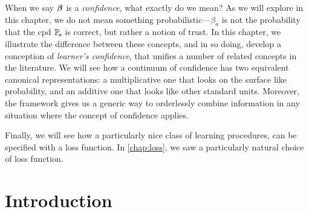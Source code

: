     \label{chap:conf}

When we say $\boldsymbol\beta$ is a \emph{confidence}, what exactly do we mean? 
As we will explore in this chapter, we do not mean something probabilistic---$\beta_a$ is not the probability that the cpd $\p_a$ is correct, but rather a notion of trust. 
In this chapter, we illustrate the difference between these concepts, and in so doing, develop a conception of \emph{learner's confidence}, that unifies a number of related concepts in the literature. 
We will see how a continuum of confidence has two equivalent canonical representations: a multiplicative one that looks on the surface like probability, and an additive one that looks like other standard units. 
Moreover, the framework gives us a generic way to orderlessly combine information in any situation where the concept of confidence applies. 


Finally, we will see how a particularly nice class of learning procedures, can be specified with a loss function. 
In \cref{chap:loss}, we saw a particularly natural choice of loss function. 


\section{Introduction}
\def\stmt{$A$}



